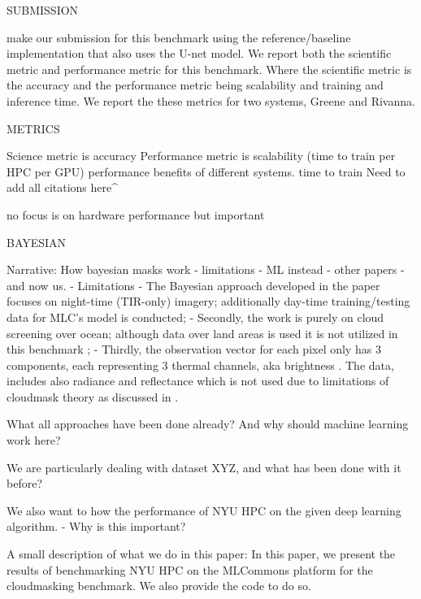 SUBMISSION

make our submission for this benchmark using the reference/baseline implementation that also uses the U-net model. We report both the scientific metric and performance metric for this benchmark. Where the scientific metric is the accuracy and the performance metric being scalability and training and inference time. We report the these metrics for two systems, Greene and Rivanna.


METRICS

Science metric is accuracy 
Performance metric is scalability (time to train per HPC per GPU) %
performance benefits of different systems.%
time to train %
Need to add all citations here^

no focus is on hardware performance but important

BAYESIAN

    
Narrative: How bayesian masks work - limitations - ML instead - other papers - and now us.
- Limitations
    - The Bayesian approach developed in the paper focuses on night-time (TIR-only) imagery; additionally day-time training/testing data for MLC's model is conducted;
    - Secondly, the work is purely on cloud screening over ocean; although  data over land areas is used it is not utilized in this benchmark ;
    - Thirdly, the observation vector for each pixel only has 3 components, each representing 3 thermal channels, aka brightness . The data, includes also radiance and reflectance which is not used due to limitations of cloudmask theory as discussed in \cite{???}.

What all approaches have been done already? And why should machine learning work here?

We are particularly dealing with dataset XYZ, and what has been done with it before?

We also want to how the performance of NYU HPC on the given deep learning algorithm. - Why is this important?

A small description of what we do in this paper:
In this paper, we present the results of benchmarking NYU HPC on the MLCommons platform for the cloudmasking benchmark. We also provide the code to do so.
